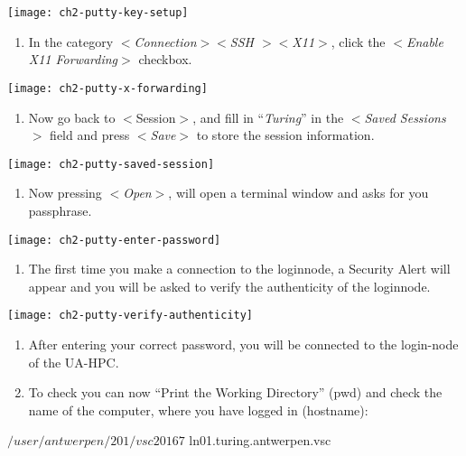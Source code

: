   \texttt{[image: ch2-putty-key-setup]}

  \begin{enumerate}
    \item  In the category $<$\textit{Connection$>$$<$SSH $>$$<$X11$>$}, click
      the $<$\textit{Enable X11 Forwarding}$>$ checkbox.
  \end{enumerate}

  \texttt{[image: ch2-putty-x-forwarding]}

  \begin{enumerate}
    \item  Now go back to $<$Session$>$, and fill in ``\textit{Turing}'' in the
      $<$\textit{Saved Sessions}$>$ field and press $<$\textit{Save}$>$ to
      store the session information.
  \end{enumerate}

  \texttt{[image: ch2-putty-saved-session]}

  \begin{enumerate}
    \item  Now pressing $<$\textit{Open}$>$, will open a terminal window and
      asks for you passphrase.
  \end{enumerate}

  \texttt{[image: ch2-putty-enter-password]}

  \begin{enumerate}
    \item  The first time you make a connection to the loginnode, a Security
      Alert will appear and you will be asked to verify the authenticity of the
      loginnode.
  \end{enumerate}

  \texttt{[image: ch2-putty-verify-authenticity]}

  \begin{enumerate}
    \item  After entering your correct password, you will be connected to the
      login-node of the UA-HPC.
    \item  To check you can now ``Print the Working Directory'' (pwd) and check
      the name of the computer, where you have logged in (hostname):
  \end{enumerate}

  \begin{prompt}
  $ %
  /user/antwerpen/201/vsc20167
  $ %
  ln01.turing.antwerpen.vsc
  \end{prompt}

